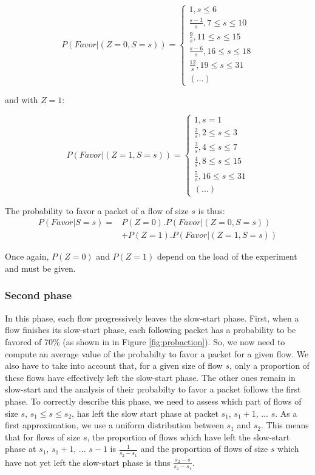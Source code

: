 \documentclass{elsart}
\begin{document}
\begin{equation}
\label{eq1}
P(Favor|(Z=0,S=s)) = \left \lbrace
\begin{array}{c}
1,s \leqslant 6 \\
\frac{s-1}{s}, 7 \leqslant s \leqslant 10 \\
\frac 9 s, 11 \leqslant s \leqslant 15 \\
\frac{s-6}{s}, 16 \leqslant s \leqslant 18 \\
\frac{12}{s}, 19 \leqslant s \leqslant 31 \\
(...)
\end{array} \right.
\end{equation}

and with $Z=1$:

\begin{equation}
\label{eq2}
P(Favor|(Z=1,S=s)) = \left \lbrace
\begin{array}{c}
1, s=1 \\
\frac 2 s, 2 \leqslant s \leqslant 3 \\
\frac 3 s, 4 \leqslant s \leqslant 7 \\
\frac 4 s, 8 \leqslant s \leqslant 15 \\
\frac 5 s, 16 \leqslant s \leqslant 31 \\
(...)
\end{array} \right.
\end{equation}

The probability to favor a packet of a flow of size $s$ is thus: 
\small
\begin{eqnarray}
\label{eqn_cond1}
P(Favor | S=s) = & P(Z=0).P(Favor|(Z=0,S=s))\\ \nonumber
& + P(Z=1).P(Favor|(Z=1,S=s))
\end{eqnarray}
\normalsize

Once again, $P(Z=0)$ and $P(Z=1)$ depend on the load of the experiment and must be given.

\subsubsection*{Second phase}

In this phase, each flow progressively leaves the slow-start phase. First, when a flow finishes its slow-start phase, each following packet has a probability to be favored of $70\%$ (as shown in in Figure \ref{fig:probaction}). So, we now need to compute an average value of the probabilty to favor a packet for a given flow. We also have to take into account that, for a given size of flow $s$, only a proportion of these flows have effectively left the slow-start phase. The other ones remain in slow-start and the analysis of their probabilty to favor a packet follows the first phase.
To correctly describe this phase, we need to assess which part of flows of size $s$, $s_1 \leqslant s \leqslant s_2$, has left the slow start phase at packet $s_1$, $s_1+1$, ... $s$. As a first approximation, we use a uniform distribution between $s_1$ and $s_2$. This means that for flows of size $s$, the proportion of flows which have left the slow-start phase at $s_1$, $s_1+1$, ... $s-1$ is $\frac{1}{s_2-s_1}$ and the proportion of flows of size $s$ which have not yet left the slow-start phase is thus $\frac{s_2-s}{s_2-s_1}$.
\end{document}
